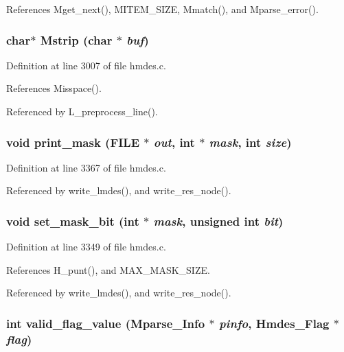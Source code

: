 References Mget\_\-next(), MITEM\_\-SIZE, Mmatch(), and Mparse\_\-error().
\subsubsection{\setlength{\rightskip}{0pt plus 5cm}char$\ast$ Mstrip (char $\ast$ {\em buf})}\label{hmdes_8h_4fcb92f95a2a4cd3b2beefcf2f8afef8}




Definition at line 3007 of file hmdes.c.

References Misspace().

Referenced by L\_\-preprocess\_\-line().
\subsubsection{\setlength{\rightskip}{0pt plus 5cm}void print\_\-mask (FILE $\ast$ {\em out}, int $\ast$ {\em mask}, int {\em size})}\label{hmdes_8h_bdc578c791b46b07c9c23509b76545ca}




Definition at line 3367 of file hmdes.c.

Referenced by write\_\-lmdes(), and write\_\-res\_\-node().
\subsubsection{\setlength{\rightskip}{0pt plus 5cm}void set\_\-mask\_\-bit (int $\ast$ {\em mask}, unsigned int {\em bit})}\label{hmdes_8h_93982c65f2c3e166d73a84df641bbc40}




Definition at line 3349 of file hmdes.c.

References H\_\-punt(), and MAX\_\-MASK\_\-SIZE.

Referenced by write\_\-lmdes(), and write\_\-res\_\-node().
\subsubsection{\setlength{\rightskip}{0pt plus 5cm}int valid\_\-flag\_\-value (\bf{Mparse\_\-Info} $\ast$ {\em pinfo}, \bf{Hmdes\_\-Flag} $\ast$ {\em flag})}\label{hmdes_8h_a3a7e52722cb239b9007ac64a3dbd605}




